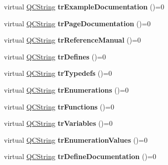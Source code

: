 \begin{DoxyCompactItemize}
\mbox{\label{class_translator_a7829ffeeebcaaddb10372921956a2d6e}} 
virtual \mbox{\hyperlink{class_q_c_string}{Q\+C\+String}} {\bfseries tr\+Example\+Documentation} ()=0
\item 
\mbox{\label{class_translator_a11de24b3e8a375ee2e6fe7cf0ecb950c}} 
virtual \mbox{\hyperlink{class_q_c_string}{Q\+C\+String}} {\bfseries tr\+Page\+Documentation} ()=0
\item 
\mbox{\label{class_translator_af35d27f8e080e06312ae9a70edcaaeaf}} 
virtual \mbox{\hyperlink{class_q_c_string}{Q\+C\+String}} {\bfseries tr\+Reference\+Manual} ()=0
\item 
\mbox{\label{class_translator_afe1d9b3dcd74bb8fb8c116c2c0e86e2e}} 
virtual \mbox{\hyperlink{class_q_c_string}{Q\+C\+String}} {\bfseries tr\+Defines} ()=0
\item 
\mbox{\label{class_translator_afcd2ee932660156f0d368863391e1c90}} 
virtual \mbox{\hyperlink{class_q_c_string}{Q\+C\+String}} {\bfseries tr\+Typedefs} ()=0
\item 
\mbox{\label{class_translator_aa64aafd8ba4afe93889cf3ca459eb862}} 
virtual \mbox{\hyperlink{class_q_c_string}{Q\+C\+String}} {\bfseries tr\+Enumerations} ()=0
\item 
\mbox{\label{class_translator_a47b276e3a96dfc48a2466b16b04c1360}} 
virtual \mbox{\hyperlink{class_q_c_string}{Q\+C\+String}} {\bfseries tr\+Functions} ()=0
\item 
\mbox{\label{class_translator_a436fe2e6f0ba8c4cdb544dd72a6e72a2}} 
virtual \mbox{\hyperlink{class_q_c_string}{Q\+C\+String}} {\bfseries tr\+Variables} ()=0
\item 
\mbox{\label{class_translator_a61bb38a3a5fa42b9e1b1045a5151f092}} 
virtual \mbox{\hyperlink{class_q_c_string}{Q\+C\+String}} {\bfseries tr\+Enumeration\+Values} ()=0
\item 
\mbox{\label{class_translator_a931507210a6681017dbcfadedc0a30ce}} 
virtual \mbox{\hyperlink{class_q_c_string}{Q\+C\+String}} {\bfseries tr\+Define\+Documentation} ()=0

\end{DoxyCompactItemize}
